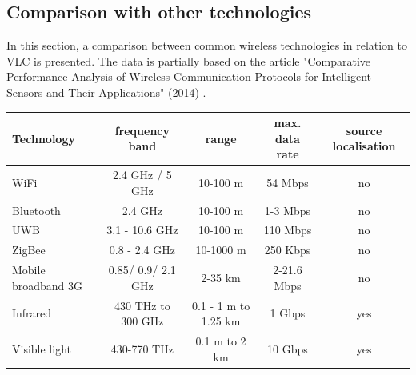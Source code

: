 \subsection{Comparison with other technologies}
In this section, a comparison between common wireless technologies in relation to VLC is presented.
The data is partially based on the article "Comparative Performance Analysis of Wireless
Communication Protocols for Intelligent Sensors
and Their Applications" (2014) \cite{comparison}.\\
\newline
  \begin{tabular}{l| c c c c}
    Technology & frequency band & range & max. data rate & source localisation\\
    \hline
   WiFi & 2.4 GHz / 5 GHz & 10-100 m &  54 Mbps & no\\
   Bluetooth & 2.4 GHz & 10-100 m & 1-3 Mbps & no \\
   UWB & 3.1 - 10.6 GHz & 10-100 m & 110 Mbps & no\\
   ZigBee & 0.8 - 2.4 GHz & 10-1000 m &  250 Kbps & no\\
   Mobile broadband 3G & 0.85/ 0.9/ 2.1 GHz & 2-35 km &  2-21.6 Mbps & no\\
   Infrared & 430 THz to 300 GHz & 0.1 - 1 m to 1.25 km & 1 Gbps & yes \\
   Visible light & 430-770 THz & 0.1 m to 2 km & 10 Gbps & yes \\
  \end{tabular}












